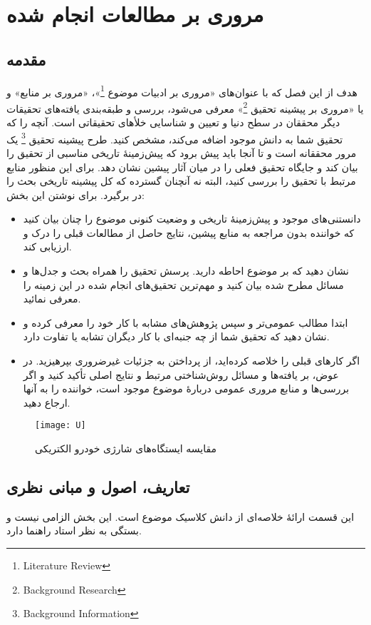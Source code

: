 \chapter{مروری بر مطالعات انجام شده}
\section{مقدمه}
هدف از این فصل که با عنوان‌های  «مروری بر ادبیات موضوع%
\footnote{Literature Review}»،
«مروری بر منابع» و یا «مروری بر پیشینه تحقیق%
\footnote{Background Research}»
معرفی می‌شود، بررسی و طبقه‌بندی یافته‌های تحقیقات دیگر محققان در سطح دنیا و تعیین و شناسایی خلأهای تحقیقاتی است. آنچه را که تحقیق شما به دانش موجود اضافه می‌کند، مشخص کنید. طرح پیشینه تحقیق%
\footnote{Background Information}
یک مرور محققانه است و تا آنجا باید پیش برود که پیش‌زمینهٔ تاریخی مناسبی از تحقیق را بیان کند و جایگاه تحقیق فعلی را در میان آثار پیشین نشان دهد. برای این منظور منابع مرتبط با تحقیق را بررسی کنید، البته نه آنچنان گسترده که کل پیشینه تاریخی بحث را در برگیرد. برای نوشتن این بخش:
\begin{itemize}
	\item
	دانستنی‌های موجود و پیش‌زمینهٔ تاریخی و وضعیت کنونی موضوع را چنان بیان کنید که خواننده بدون مراجعه به منابع پیشین، نتایج حاصل از مطالعات قبلی را درک و ارزیابی کند.
	\item
	نشان دهید که بر موضوع احاطه دارید. پرسش تحقیق را همراه بحث و جدل‌ها و مسائل مطرح شده بیان کنید و مهم‌ترین تحقیق‌های انجام شده در این زمینه را معرفی نمائید.
	\item
	ابتدا مطالب عمومی‌تر و سپس پژوهش‌های مشابه با کار خود را معرفی کرده و نشان دهید که تحقیق شما از چه جنبه‌ای با کار دیگران تشابه یا تفاوت دارد.
	\item
	اگر کارهای قبلی را خلاصه کرده‌اید، از پرداختن به جزئیات غیرضروری بپرهیزید. در عوض، بر یافته‌ها و مسائل روش‌شناختی مرتبط و نتایج اصلی تأکید کنید و اگر بررسی‌ها و منابع مروری عمومی دربارهٔ موضوع موجود است، خواننده را به آنها ارجاع دهید.
\end{itemize}

\begin{figure}[!htbp]
	\centering
\texttt{[image: U]}
\caption{مقایسه ایستگاه‌های شارژی خودرو الکتریکی}
\label{figure}
\end{figure}


\section{تعاریف، اصول و مبانی نظری}
این قسمت ارائهٔ خلاصه‌ای از دانش کلاسیک موضوع است. این بخش الزامی نیست و بستگی به نظر استاد راهنما دارد.

